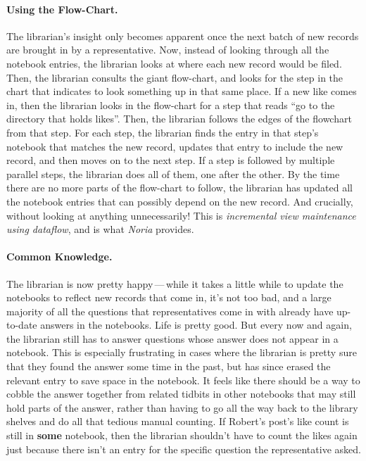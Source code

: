 \paragraph{Using the Flow-Chart.}
%
The librarian's insight only becomes apparent once the next batch of new records
are brought in by a representative. Now, instead of looking through all the
notebook entries, the librarian looks at where each new record would be filed.
Then, the librarian consults the giant flow-chart, and looks for the step in the
chart that indicates to look something up in that same place. If a new like
comes in, then the librarian looks in the flow-chart for a step that reads ``go
to the directory that holds likes''. Then, the librarian follows the edges of
the flowchart from that step. For each step, the librarian finds the entry in
that step's notebook that matches the new record, updates that entry to include
the new record, and then moves on to the next step. If a step is followed by
multiple parallel steps, the librarian does all of them, one after the other. By
the time there are no more parts of the flow-chart to follow, the librarian has
updated all the notebook entries that can possibly depend on the new record. And
crucially, without looking at anything unnecessarily! This is
\textit{incremental view maintenance using dataflow}, and is what \textit{Noria}
provides.

\paragraph{Common Knowledge.}
%
The librarian is now pretty happy\,---\,while it takes a little while to update
the notebooks to reflect new records that come in, it's not too bad, and a large
majority of all the questions that representatives come in with already have
up-to-date answers in the notebooks. Life is pretty good. But every now and
again, the librarian still has to answer questions whose answer does not appear
in a notebook. This is especially frustrating in cases where the librarian is
pretty sure that they found the answer some time in the past, but has since
erased the relevant entry to save space in the notebook. It feels like there
should be a way to cobble the answer together from related tidbits in other
notebooks that may still hold parts of the answer, rather than having to go all
the way back to the library shelves and do all that tedious manual counting. If
Robert's post's like count is still in \textbf{some} notebook, then the
librarian shouldn't have to count the likes again just because there isn't an
entry for the specific question the representative asked.

